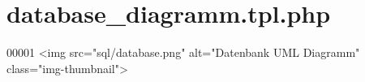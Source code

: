 \hypertarget{database__diagramm_8tpl_8php}{\section{database\-\_\-diagramm.\-tpl.\-php}
\label{database__diagramm_8tpl_8php}
}

\begin{DoxyCode}
00001         <img src=\textcolor{stringliteral}{"sql/database.png"} alt=\textcolor{stringliteral}{"Datenbank UML Diagramm"} \textcolor{keyword}{class}=\textcolor{stringliteral}{"img-thumbnail"}>
\end{DoxyCode}
